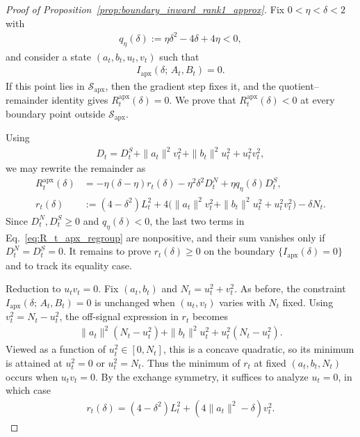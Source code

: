 \documentclass[10pt,a4paper]{amsart}
\newcommand{\apx}{\mathrm{apx}}
\newcommand{\iapx}{I_{\mathrm{apx}}}
\providecommand{\paragraph}{}
\begin{document}
\begin{proof}[Proof of Proposition~\ref{prop:boundary_inward_rank1_approx}]
Fix $0<\eta<\delta<2$ with
\begin{align}
    q_\eta(\delta):=\eta\delta^2-4\delta+4\eta<0,
\end{align}
and consider a state $(a_t,b_t,u_t,v_t)$ such that
\begin{align*}
    \iapx(\delta;\,A_t,B_t)=0.
\end{align*}
If this point lies in $\mathcal S_\apx$, then the gradient step fixes it, and the
quotient--remainder identity gives $R_t^\apx(\delta)=0$. We prove that
$R_t^\apx(\delta)<0$ at every boundary point outside $\mathcal S_\apx$.

Using
\begin{align}
    D_t
    =D_t^S+\|a_t\|^2v_t^2+\|b_t\|^2u_t^2+u_t^2v_t^2,
\end{align}
we may rewrite the remainder as
\begin{align}
    R_t^\apx(\delta)
    &=-\eta(\delta-\eta)r_t(\delta)
      -\eta^2\delta^2D_t^N
      +\eta q_\eta(\delta)D_t^S,
      \label{eq:R_t_apx_regroup}\\
    r_t(\delta)
    &:=(4-\delta^2)L_t^2
      +4\bigl(\|a_t\|^2v_t^2+\|b_t\|^2u_t^2+u_t^2v_t^2\bigr)
      -\delta N_t.
      \label{eq:r_t_apx_regroup}
\end{align}
Since $D_t^N,D_t^S\ge0$ and $q_\eta(\delta)<0$, the last two terms in
Eq.~\eqref{eq:R_t_apx_regroup} are nonpositive, and their sum vanishes only if
$D_t^N=D_t^S=0$. It remains to prove $r_t(\delta)\ge0$ on
the boundary $\{\iapx(\delta)=0\}$ and to track its equality case.

\paragraph{Reduction to $u_tv_t=0$.}
Fix $(a_t,b_t)$ and $N_t=u_t^2+v_t^2$. As before, the constraint
$\iapx(\delta;\,A_t,B_t)=0$ is unchanged when $(u_t,v_t)$ varies with
$N_t$ fixed. Using
$v_t^2=N_t-u_t^2$, the off-signal expression in $r_t$ becomes
\begin{align}
    \|a_t\|^2(N_t-u_t^2)
    +\|b_t\|^2u_t^2
    +u_t^2(N_t-u_t^2).
\end{align}
Viewed as a function of $u_t^2\in[0,N_t]$, this is a concave quadratic, so its
minimum is attained at $u_t^2=0$ or $u_t^2=N_t$. Thus the minimum of $r_t$ at
fixed $(a_t,b_t,N_t)$ occurs when $u_tv_t=0$. By the exchange symmetry, it
suffices to analyze $u_t=0$, in which case
\begin{align}
    r_t(\delta)
    =(4-\delta^2)L_t^2+(4\|a_t\|^2-\delta)v_t^2.
    \label{eq:r_reduced_apx}
\end{align}


\end{proof}
\end{document}
